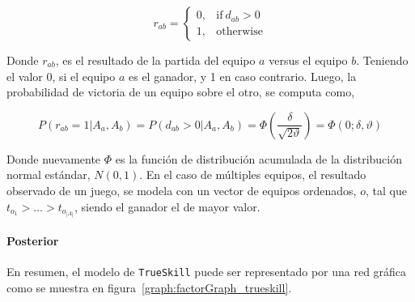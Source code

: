 \documentclass[11pt,twoside, spanish]{report} %
\begin{document}
\begin{equation}
	r_{ab} =
	\begin{cases}
		0, & \text{if}\ d_{ab} > 0 \\
		1, & \text{otherwise}
	\end{cases}
\end{equation}

Donde $r_{ab}$, es el resultado de la partida del equipo $a$ versus el equipo $b$.
Teniendo el valor 0, si el equipo $a$ es el ganador, y 1 en caso contrario.
Luego, la probabilidad de victoria de un equipo sobre el otro, se computa como,


\begin{equation} \label{eq:proba_win}
P(r_{ab}=1|A_a,A_b) = P(d_{ab} > 0 | A_a,A_b) = \Phi\left( \frac{\delta}{\sqrt{2\vartheta} } \right)= \Phi\left( 0; \delta, \vartheta \right)
\end{equation}

Donde nuevamente $\Phi$ es la funci\'on de distribuci\'on acumulada de la distribuci\'on normal est\'andar, $N(0, 1)$.
En el caso de m\'ultiples equipos, el resultado observado de un juego, se modela con un vector de equipos ordenados, $o$, tal que $t_{o_1}> \dots > t_{o_{|A|}}$, siendo el ganador el de mayor valor.

\paragraph{Posterior} En resumen, el modelo de \texttt{TrueSkill} puede ser representado por una red gr\'afica como se muestra en figura~\ref{graph:factorGraph_trueskill}.
\end{document}

